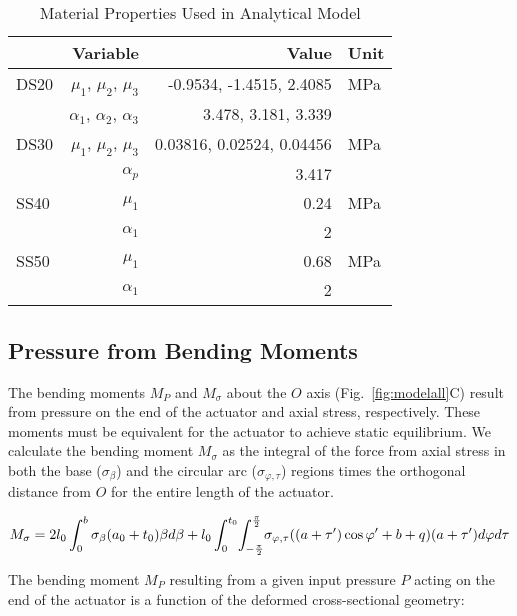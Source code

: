 \begin{table}[h!]
\caption{Material Properties Used in Analytical Model}
\label{table}
\centering
\begin{tabular}{l r r l}
\hline
{} & \bfseries Variable & \bfseries Value & \bfseries Unit \\
\hline\hline
DS20 \cite{marechal_toward_2021} & $\mu_1$, $\mu_2$, $\mu_3$ & -0.9534, -1.4515, 2.4085 & MPa\\
{} & $\alpha_1$, $\alpha_2$, $\alpha_3$ & 3.478, 3.181, 3.339 & {}\\
\hline
DS30 \cite{marechal_toward_2021} & $\mu_1$, $\mu_2$, $\mu_3$ & 0.03816, 0.02524, 0.04456 & MPa\\
{} & $\alpha_p$ & 3.417 & {}\\
\hline
SS40 \cite{pagoli_review_2022} & $\mu_1$ & 0.24 & MPa\\
{} & $\alpha_1$ & 2 & {}\\
\hline
SS50 \cite{xavier_finite_2021} & $\mu_1$ & 0.68 & MPa\\
{} & $\alpha_1$ & 2 & {}\\
\end{tabular}
\label{table}
\end{table}

\clearpage
\subsection{Pressure from Bending Moments}

The bending moments $M_P$ and $M_\sigma$ about the \(O\) axis (Fig.~\ref{fig:modelall}C) result from pressure on the end of the actuator and axial stress, respectively. These moments must be equivalent for the actuator to achieve static equilibrium. We calculate the bending moment $M_\sigma$ as the integral of the force from axial stress in both the base ($\sigma_{\beta}$) and the circular arc ($\sigma_{\varphi, \tau}$) regions times the orthogonal distance from \(O\) for the entire length of the actuator. 

\begin{equation}
    M_{\sigma} = 2l_{0} \int_{0}^{b} \sigma_{\beta} (a_0+t_0) \beta  d\beta
    + l_{0}\int_{0}^{t_0}\hspace{-2px}\int_{-\frac{\pi}{2}}^{\frac{\pi}{2}}\hspace{-2px}\sigma_{\varphi,\tau}((a+\tau')\cos{\varphi'}+b+q)(a+\tau') d\varphi d\tau
    \label{eq:moment-axial}
\end{equation}

The bending moment $M_P$ resulting from a given input pressure \(P\) acting on the end of the actuator is a function of the deformed cross-sectional geometry: 

